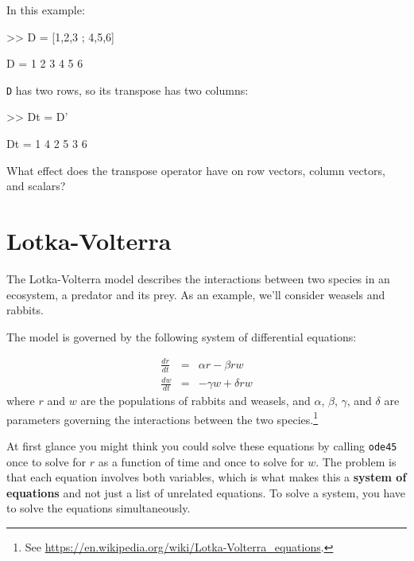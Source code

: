 \documentclass[
]{book}
\numberwithin{Answer}{chapter}
\numberwithin{Exercise}{chapter}
\begin{document}

In this example:

\begin{code}
>> D = [1,2,3 ; 4,5,6]

D =  1     2     3
     4     5     6
\end{code}

{\tt D} has two rows, so its transpose has two columns:

\begin{code}
>> Dt = D'

Dt = 1     4
     2     5
     3     6
\end{code}

\begin{ex}
What effect does the transpose operator
have on row vectors, column vectors, and scalars?
\end{ex}


\section{Lotka-Volterra}
\label{sect:lotka}

The Lotka-Volterra model describes the interactions between two
species in an ecosystem, a predator and its prey.  As an example, we'll consider weasels and rabbits.


The model is governed by the following system of differential equations:

\begin{eqnarray}
    \frac{dr}{dt} &=& \alpha r - \beta r w
    \\[6pt]
    \frac{dw}{dt} &=& - \gamma w + \delta r w
\end{eqnarray}
%
where $r$ and $w$ are the populations of rabbits and weasels,
and $\alpha$, $\beta$, $\gamma$, and $\delta$ are parameters
governing the interactions between the two species.\footnote{See
\url{https://en.wikipedia.org/wiki/Lotka-Volterra_equations}.}

At first glance you might think you could solve these equations by
calling {\tt ode45} once to solve for $r$ as a function of time and
once to solve for $w$.  The problem is that each equation involves
both variables, which is what makes this a {\bf system of equations}
and not just a list of unrelated equations.  To solve a system, you
have to solve the equations simultaneously.

\end{document}
